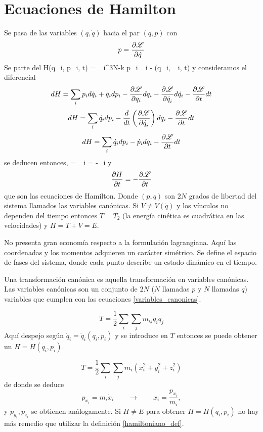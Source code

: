 \documentclass[10pt,oneside]{CBFT_book}
\begin{document}
\chapter{Ecuaciones de Hamilton}

Se pasa de las variables $(q, \dot{q})$ hacia el par $(q,p)$ con 
\[
	p = \frac{\partial^{\hspace{-0.05em}} {\mathscr{L}}}{\partial {\dot{q}}^{\hspace{-0.05em}}}
\]
Se parte del 
\be
	H(q_i, p_i, t) = \sum_{i}^{3N-k} p_i _i - \Lag(q_i, _i, t)
	\label{hamiltoniano_def}
\ee
y consideramos el diferencial
\[
	dH = \sum_i p_i d\dot{q}_i + \dot{q}_i dp_i - \frac{\partial^{\hspace{-0.05em}} {\mathscr{L}}}{\partial {q_i}^{\hspace{-0.05em}}} dq_i - \frac{\partial^{\hspace{-0.05em}} {\mathscr{L}}}{\partial {\dot{q}_i}^{\hspace{-0.05em}}}d\dot{q}_i - \frac{\partial^{\hspace{-0.05em}} {\mathscr{L}}}{\partial {t}^{\hspace{-0.05em}}}dt
\]
\[
	dH = \sum_i \dot{q}_i dp_i - \frac{d}{dt}\left( \frac{\partial^{\hspace{-0.05em}} {\mathscr{L}}}{\partial {\dot{q}_i}^{\hspace{-0.05em}}} \right) dq_i - \frac{\partial^{\hspace{-0.05em}} {\mathscr{L}}}{\partial {t}^{\hspace{-0.05em}}}dt
\]
\[
	dH = \sum_i \dot{q}_i dp_i - \dot{p}_i dq_i - \frac{\partial^{\hspace{-0.05em}} {\mathscr{L}}}{\partial {t}^{\hspace{-0.05em}}}dt
\]
se deducen entonces,
\be
	 = _i \qquad \qquad {} = -_i 
	\label{variables_canonicas}
\ee
y
\[
	\frac{\partial^{\hspace{-0.05em}} {H}}{\partial {t}^{\hspace{-0.05em}}} = -\frac{\partial^{\hspace{-0.05em}} {\mathscr{L}}}{\partial {t}^{\hspace{-0.05em}}}
\]
que son las ecuaciones de Hamilton. Donde $(p,q)$ son $2N$ grados de libertad del sistema llamados las variables canónicas.
Si $V\neq V(\dot{q})$ y los vínculos no dependen del tiempo entonces $T=T_2$ (la energía cinética es cuadrática en las 
velocidades) y $H = T + V = E$.


No presenta gran economía respecto a la formulación lagrangiana.
Aquí las coordenadas y los momentos adquieren un carácter simétrico.
Se define el espacio de fases del sistema, donde cada punto describe un estado dinámico en el tiempo.

Una transformación canónica es aquella transformación en variables canónicas.
Las variables canónicas son un conjunto de $2N$ ($N$ llamadas $p$ y $N$ llamadas $q$) variables que cumplen con las
ecuaciones \eqref{variables_canonicas}.

\[
	T = \frac 1 2 \sum_i \sum_j m_{ij} \dot{q}_i \dot{q}_j
\]
Aquí despejo según $ \dot{q}_i =  \dot{q}_i( q_i, p_i ) $ y se introduce en $T$ entonces se puede obtener un
$H = H(q_i,p_i) $.

\[
	T = \frac 1 2 \sum_i \sum_j m_i ( \dot{x}_i^2 + \dot{y}_i^2 + \dot{z}_i^2 )
\]
de donde se deduce 
\[
	p_{x_i} = m_i \dot{x}_i \qquad \to \qquad  \dot{x}_i = \frac{p_{x_i}}{m_i}, 
\]
y $p_{y_i}, p_{z_i}$ se obtienen análogamente.
Si $H \neq E$ para obtener $H=H(q_i,p_i)$ no hay más remedio que utilizar la definición \eqref{hamiltoniano_def}.
\end{document}
